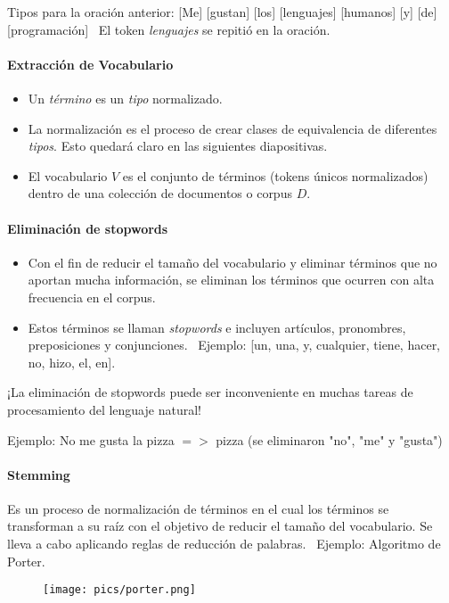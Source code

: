 Tipos para la oración anterior: [Me] [gustan] [los] [lenguajes] [humanos] [y] [de] [programación] \
El token \emph{lenguajes} se repitió en la oración.

\paragraph{Extracción de Vocabulario}

\begin{itemize}
\item Un \emph{término} es un \emph{tipo} normalizado.
\item La normalización es el proceso de crear clases de equivalencia de diferentes \emph{tipos}. Esto quedará claro en las siguientes diapositivas.
\item El vocabulario $V$ es el conjunto de términos (tokens únicos normalizados) dentro de una colección de documentos o corpus $D$.
\end{itemize}

\paragraph{Eliminación de stopwords}
\begin{itemize}
\item Con el fin de reducir el tamaño del vocabulario y eliminar términos que no aportan mucha información, se eliminan los términos que ocurren con alta frecuencia en el corpus.
\item Estos términos se llaman \emph{stopwords} e incluyen artículos, pronombres, preposiciones y conjunciones. \
Ejemplo: [un, una, y, cualquier, tiene, hacer, no, hizo, el, en].
\end{itemize}

¡La eliminación de stopwords puede ser inconveniente en muchas tareas de procesamiento del lenguaje natural!

Ejemplo: No me gusta la pizza $=>$ pizza (se eliminaron "no", "me" y "gusta")

\paragraph{Stemming}

Es un proceso de normalización de términos en el cual los términos se transforman a su raíz con el objetivo de reducir el tamaño del vocabulario. Se lleva a cabo aplicando reglas de reducción de palabras. \
Ejemplo: Algoritmo de Porter.

\begin{figure}[h!]
\centering
\texttt{[image: pics/porter.png]}
\end{figure}

